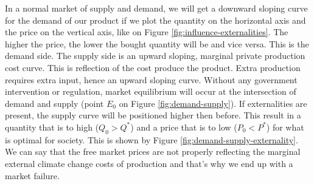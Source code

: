 \documentclass[../summary.tex]{subfiles}
\begin{document}
	  In a normal market of supply and demand, we will get a downward sloping curve for the demand of our product if we plot the quantity on the horizontal axis and the price on the vertical axis, like on Figure \ref{fig:influence-externalities}. The higher the price, the lower the bought quantity will be and vice versa. This is the demand side. The supply side is an upward sloping, marginal private production cost curve. This is  reflection of the cost produce the product. Extra production requires extra input, hence an upward sloping curve. Without any government intervention or regulation, market equilibrium will occur at the intersection of demand and supply (point $E_{0}$ on Figure \ref{fig:demand-supply}). If externalities are present, the supply curve will be positioned higher then before. This result in a quantity that is to high ($Q_{0} > Q^{*}$) and a price that is to low ($P_{0} < P^{*}$) for what is optimal for society. This is shown by Figure \ref{fig:demand-supply-externality}. We can say that the free market prices are not properly reflecting the marginal external climate change costs of production and that's why we end up with a market failure.
	  
\end{document}
